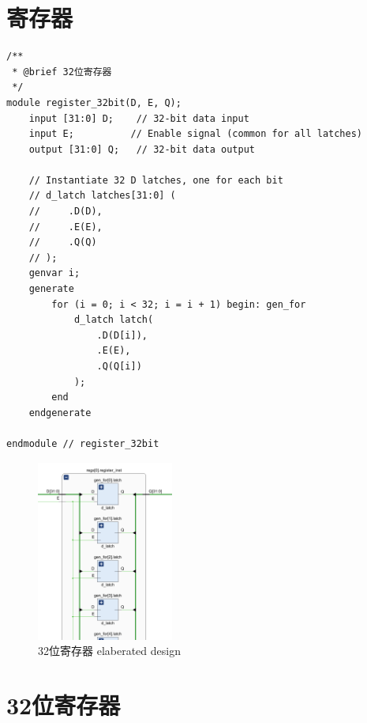 \documentclass[AutoFakeBold]{LZUThesis}
\begin{document}
\section{寄存器}
\begin{lstlisting}[style={verilog-style}]
/**
 * @brief 32位寄存器
 */
module register_32bit(D, E, Q);
    input [31:0] D;    // 32-bit data input
    input E;          // Enable signal (common for all latches)
    output [31:0] Q;   // 32-bit data output

    // Instantiate 32 D latches, one for each bit
    // d_latch latches[31:0] (
    //     .D(D), 
    //     .E(E), 
    //     .Q(Q)
    // );
    genvar i;
    generate
        for (i = 0; i < 32; i = i + 1) begin: gen_for
            d_latch latch(
                .D(D[i]), 
                .E(E), 
                .Q(Q[i])
            );
        end
    endgenerate

endmodule // register_32bit
\end{lstlisting}

\begin{figure}[htbp]
    \centering
    \includegraphics[width=0.4\textwidth]{img/register_ele}
    \caption{32位寄存器 elaberated design}
\end{figure}

\section{32位寄存器}
\end{document}
